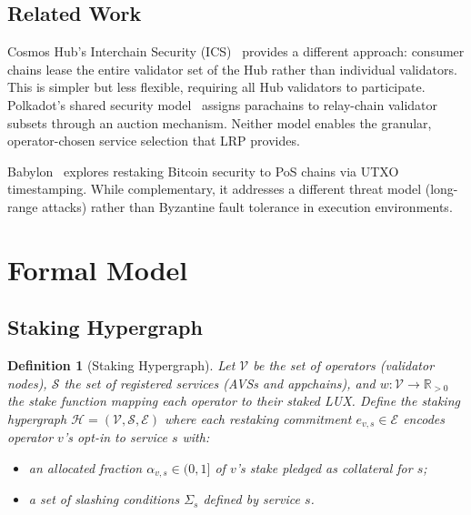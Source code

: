 \documentclass[11pt]{article}
\newtheorem{definition}{Definition}
\begin{document}
\subsection{Related Work}

Cosmos Hub's Interchain Security (ICS)~\cite{cosmos2022ics} provides a different approach:
consumer chains lease the entire validator set of the Hub rather than individual validators.
This is simpler but less flexible, requiring all Hub validators to participate. Polkadot's
shared security model~\cite{wood2016polkadot} assigns parachains to relay-chain validator
subsets through an auction mechanism. Neither model enables the granular, operator-chosen
service selection that LRP provides.

Babylon~\cite{babylon2023bitcoin} explores restaking Bitcoin security to PoS chains via
UTXO timestamping. While complementary, it addresses a different threat model (long-range
attacks) rather than Byzantine fault tolerance in execution environments.

\section{Formal Model}
\label{sec:model}

\subsection{Staking Hypergraph}

\begin{definition}[Staking Hypergraph]
Let $\mathcal{V}$ be the set of \emph{operators} (validator nodes), $\mathcal{S}$ the set
of registered \emph{services} (AVSs and appchains), and $w: \mathcal{V} \to \mathbb{R}_{>0}$
the stake function mapping each operator to their staked LUX. Define the
\emph{staking hypergraph} $\mathcal{H} = (\mathcal{V}, \mathcal{S}, \mathcal{E})$ where
each \emph{restaking commitment} $e_{v,s} \in \mathcal{E}$ encodes operator $v$'s
opt-in to service $s$ with:
\begin{itemize}
  \item an \emph{allocated fraction} $\alpha_{v,s} \in (0,1]$ of $v$'s stake pledged as
    collateral for $s$;
  \item a set of \emph{slashing conditions} $\Sigma_s$ defined by service $s$.
\end{itemize}
\end{definition}
\end{document}

